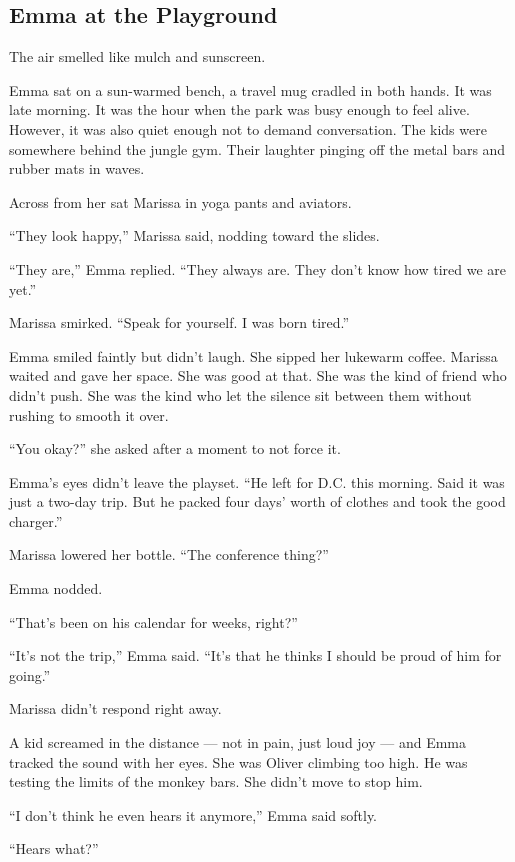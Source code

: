 
\subsection{Emma at the Playground}

The air smelled like mulch and sunscreen.

Emma sat on a sun-warmed bench, a travel mug cradled in both hands. 
It was late morning. 
It was the hour when the park was busy enough to feel alive. 
However, it was also quiet enough not to demand conversation. 
The kids were somewhere behind the jungle gym. 
Their laughter pinging off the metal bars and rubber mats in waves.

Across from her sat Marissa in yoga pants and aviators.

``They look happy,'' Marissa said, nodding toward the slides.

``They are,'' Emma replied. ``They always are. They don’t know how tired we are yet.''

Marissa smirked. ``Speak for yourself. I was born tired.''

Emma smiled faintly but didn’t laugh. 
She sipped her lukewarm coffee. 
Marissa waited and gave her space. 
She was good at that. 
She was the kind of friend who didn’t push. 
She was the kind who let the silence sit between them without rushing to smooth it over.

``You okay?'' she asked after a moment to not force it.

Emma’s eyes didn’t leave the playset. ``He left for D.C. this morning. Said it was just a two-day trip. 
But he packed four days’ worth of clothes and took the good charger.''

Marissa lowered her bottle. ``The conference thing?''

Emma nodded.

``That’s been on his calendar for weeks, right?''

``It’s not the trip,'' Emma said. ``It’s that he thinks I should be proud of him for going.''

Marissa didn’t respond right away.

A kid screamed in the distance --- not in pain, just loud joy --- and Emma tracked the sound with her eyes. 
She was Oliver climbing too high. 
He was testing the limits of the monkey bars. 
She didn't move to stop him.

``I don’t think he even hears it anymore,'' Emma said softly.

``Hears what?''

